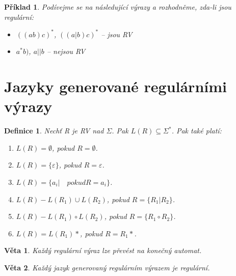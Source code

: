\documentclass[10pt, a4paper, titlepage]{article}
\theoremstyle{note}
\newtheorem{veta}{\textbf{Věta}}
\newtheorem{definice}{\textbf{Definice}}
\newtheorem{priklad}{\textbf{Příklad}}
\begin{document}
\begin{priklad}
Podívejme se na následující výrazy a rozhodněme, zda-li jsou regulární:

\begin{itemize}
\item
$((ab)c)^{*}$, $((a|b)c)^{*}$ -- jsou RV

\item
$a^{*}b)$, $a||b$ -- nejsou RV
\end{itemize}
\end{priklad}

\section{Jazyky generované regulárními výrazy}

\begin{definice}
Nechť \emph{R} je RV nad $\Sigma$. Pak $L(R) \subseteq \Sigma^{*}$. Pak také platí:

\begin{enumerate}
\item\label{jazyky-1}
$L(R) = \emptyset$, pokud $R = \emptyset$.

\item
$L(R) = \lbrace \varepsilon \rbrace$, pokud $R = \varepsilon$.

\item\label{jazyky-3}
$L(R) = \lbrace a_{i} | \quad pokud R=a_{i} \rbrace$.

\item\label{jazyky-4}
$L(R) - L(R_{1}) \cup L(R_{2})$, pokud $R=\lbrace R_{1} | R_{2} \rbrace$. 

\item\label{jazyky-5}
$L(R) - L(R_{1}) \circ L(R_{2})$, pokud $R=\lbrace R_{1}\circ R_{2} \rbrace$.

\item\label{jazyky-6}
$L(R) = L(R_{1})* $, pokud $R = R_{1}*$.
\end{enumerate}
\end{definice}

\begin{veta}
Každý regulární výraz lze převést na konečný automat.
\end{veta}

\begin{veta}
Každý jazyk generovaný regulárním výrazem je regulární.
\end{veta}
\end{document}

